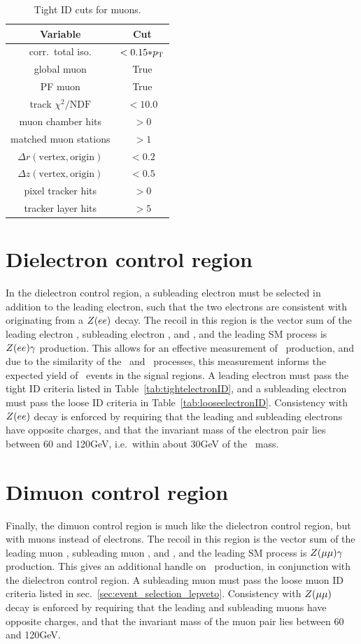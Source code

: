 \begin{table}
\centering
\begin{tabular}{ cc }
\hline
Variable & Cut \\
\hline
corr.\ total iso. & $< 0.15{*}p_\mathrm{T}$ \\
global muon & True \\
PF muon & True \\
track $\chi^{2}/\mathrm{NDF}$ & $< 10.0$ \\
muon chamber hits & $> 0$ \\
matched muon stations & $> 1$ \\
$\Delta r(\mathrm{vertex}, \mathrm{origin})$ & $< 0.2$ \\
$\Delta z(\mathrm{vertex}, \mathrm{origin})$ & $< 0.5$ \\
pixel tracker hits & $> 0$ \\
tracker layer hits & $> 5$ \\
\hline
\end{tabular}
\caption{Tight ID cuts for muons.}
\label{tab:tightmuonID}
\end{table}

\section{Dielectron control region} \label{sec:event_selection_diele}
In the dielectron control region, a subleading electron must be selected in addition to the leading electron, such that the two electrons
are consistent with originating from a $Z(ee)$ decay.
The recoil in this region is the vector sum of the leading electron \pT, subleading electron \pT, and \vecMET, and the leading SM process
is $Z(ee)\gamma$ production. This allows for an effective measurement of \zllg\ production, and due to the similarity of the \zinvg\ and \zllg\ processes,
this measurement informs the expected yield of \zinvg\ events in the signal regions.
A leading electron must pass the tight ID criteria listed in Table~\ref{tab:tightelectronID},
and a subleading electron must pass the loose ID criteria in Table~\ref{tab:looseelectronID}.
Consistency with $Z(ee)$ decay is enforced by requiring that the leading and subleading electrons have opposite charges, and that the invariant mass of the
electron pair lies between 60 and 120\unit{GeV}, i.e.\ within about 30\unit{GeV} of the \PZ\ mass.

\section{Dimuon control region} \label{sec:event_selection_dimu}
Finally, the dimuon control region is much like the dielectron control region, but with muons instead of electrons.
The recoil in this region is the vector sum of the leading muon \pT, subleading muon \pT, and \vecMET, and the leading SM process
is $Z(\mu\mu)\gamma$ production. This gives an additional handle on \zinvg\ production, in conjunction with the dielectron control region.
A subleading muon must pass the loose muon ID criteria listed in sec.~\ref{sec:event_selection_lepveto}.
Consistency with $Z(\mu\mu)$ decay is enforced by requiring that the leading and subleading muons have opposite charges, and that the invariant mass of the
muon pair lies between 60 and 120\unit{GeV}.
